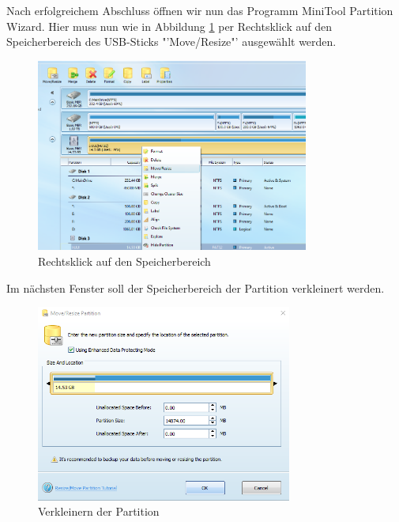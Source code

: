 Nach erfolgreichem Abschluss öffnen wir nun das Programm MiniTool Partition Wizard. Hier muss nun wie in Abbildung \ref{fig:rightclick resize} per Rechtsklick auf den Speicherbereich des USB-Sticks "'Move/Resize"' ausgewählt werden.
	\begin{figure}[H]
		\centering
		\includegraphics[width=0.8\textwidth]{images/prep/click_resize_part.png}
		\caption{Rechtsklick auf den Speicherbereich}
		\label{fig:rightclick resize}
	\end{figure}
Im nächsten Fenster soll der Speicherbereich der Partition verkleinert werden.
	\begin{figure}[H]
		\centering
		\includegraphics[width=0.75\textwidth]{images/prep/resize_window.png}
		\caption{Verkleinern der Partition}
		\label{fig:start resize partition}
	\end{figure} 


